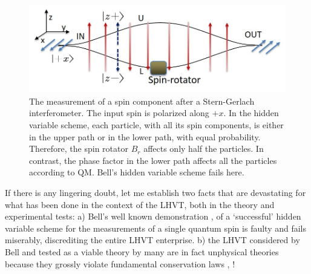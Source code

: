 \begin{figure}[H]
\centering
\includegraphics[scale=0.55]{src/images/chap27/4.jpg}
\caption{The measurement of a spin component after a Stern-Gerlach interferometer. The input spin
is polarized along $+x$. In the hidden variable scheme, each particle, with all its spin components,
is either in the upper path or in the lower path, with equal probability. Therefore, the spin rotator
$B_r$ affects only half the particles. In contrast, the phase factor in the lower path affects all the
particles according to QM. Bell's hidden variable scheme fails here.}\label{ch14-fig4}
\end{figure}

If there is any lingering doubt, let me establish two facts that are devastating for what
has been done in the context of the LHVT, both in the theory and experimental tests: a)
Bell's well known demonstration \cite{chap14-key12}, \cite{chap14-key13} of a `successful' hidden variable scheme for the
measurements of a single quantum spin is faulty and fails miserably, discrediting the entire
LHVT enterprise. b) the LHVT considered by Bell and tested as a viable theory by many
are in fact unphysical theories because they grossly violate fundamental conservation laws
\cite{chap14-key14}, \cite{chap14-key15}!

